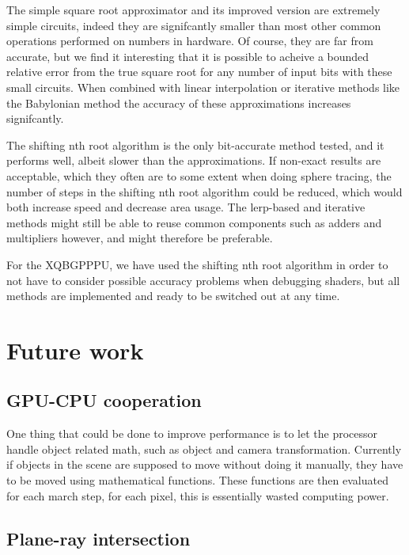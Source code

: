		The simple square root approximator and its improved version are
		extremely simple circuits, indeed they are signifcantly smaller than
		most other common operations performed on numbers in hardware. Of
		course, they are far from accurate, but we find it interesting that it
		is possible to acheive a bounded relative error from the true square
		root for any number of input bits with these small circuits. When
		combined with linear interpolation or iterative methods like the
		Babylonian method the accuracy of these approximations increases 
		signifcantly.
		
		The shifting nth root algorithm is the only bit-accurate method tested,
		and it performs well, albeit slower than the approximations. If
		non-exact results are acceptable, which they often are to some extent
		when doing sphere tracing, the number of steps in the shifting nth root
		algorithm could be reduced, which would both increase speed and
		decrease area usage. The lerp-based and iterative methods might still
		be able to reuse common components such as adders and multipliers 
		however, and might therefore be preferable.
		
		For the XQBGPPPU, we have used the shifting nth root algorithm in order
		to not have to consider possible accuracy problems when debugging 
		shaders, but all methods are implemented and ready to be switched out
		at any time.

	\section{Future work}

		\subsection{GPU-CPU cooperation}
			One thing that could be done to improve performance is to let the
			processor handle object related math, such as object and camera 
			transformation. Currently if objects in the scene are supposed to 
			move without doing it manually, they have to be moved using 
			mathematical functions. These functions are then evaluated for 
			each march step, for each pixel, this is essentially wasted 
			computing power.


		\subsection{Plane-ray intersection}

